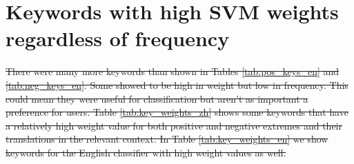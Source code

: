 \documentclass[smallextended,natbib]{svjour3}       %
\providecommand{\DIFdel}[1]{{\protect\color{red}\sout{#1}}}                      %
\begin{document}
\section{Keywords with high SVM weights regardless of frequency}%
\addtocounter{section}{-1}%

\DIFdel{There were many more keywords than shown in Tables \ref{tab:pos_keys_en} and \ref{tab:neg_keys_en}. Some showed to be high in weight but low in frequency. This could mean they were useful for classification but aren't as important a preference for users. Table \ref{tab:key_weights_zh} shows some keywords that have a relatively high weight value for both positive and negative extremes and their translations in the relevant context. In Table \ref{tab:key_weights_en} we show keywords for the English classifier with high weight values as well.
}%
\end{document}
